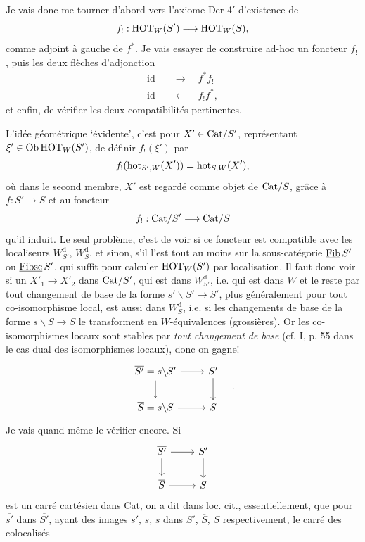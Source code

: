 Je vais donc me tourner d'abord vers l'axiome Der 4$'$ d'existence de
\[ f_! : \mathrm{HOT}_W(S') \longrightarrow \mathrm{HOT}_W(S), \]
comme adjoint à gauche de $f^*$. Je vais essayer de construire ad-hoc un foncteur $f_!$, puis les deux flèches d'adjonction
\[ \begin{aligned} \mathrm{id} &\quad\longrightarrow\quad f^*f_! \\ \mathrm{id} &\quad\longleftarrow\quad f_!f^*, \end{aligned} \]
et enfin, de vérifier les deux compatibilités pertinentes.

L'idée géométrique `évidente', c'est pour $X'\in\mathrm{Cat}/S'$, représentant $\xi'\in\mathrm{Ob}\,\mathrm{HOT}_W(S')$, de définir $f_!(\xi')$ par
\[ f_!(\mathrm{hot}_{S',W}(X')) = \mathrm{hot}_{S,W}(X'), \]
où dans le second membre, $X'$ est regardé comme objet de $\mathrm{Cat}/S$, grâce à $f:S'\longrightarrow S$ et au foncteur
\[ f_! : \mathrm{Cat}/S' \longrightarrow \mathrm{Cat}/S \]
qu'il induit. Le seul problème, c'est de voir si ce foncteur est compatible avec les
localiseurs $W_{S'}^{\mathrm{d}}$, $W_S^{\mathrm{d}}$, et sinon, s'il l'est tout au moins sur la sous-catégorie $\underline{\mathrm{Fib}}\,S'$ ou $\underline{\mathrm{Fibsc}}\,S'$, qui suffit pour calculer $\mathrm{HOT}_W(S')$ par localisation. Il faut donc voir si un $X'_1\longrightarrow X'_2$ dans $\mathrm{Cat}/S'$, qui est dans $W_{S'}^{\mathrm{d}}$, i.e. qui est dans $W$ et le reste par tout changement de base de la forme $s'\backslash S'\longrightarrow S'$, plus généralement pour tout co-isomorphisme local, est aussi dans $W_S^{\mathrm{d}}$, i.e. si les changements de base de la forme $s\backslash S\longrightarrow S$ le transforment en $W$-équivalences (grossières). Or les co-isomorphismes locaux sont stables par \textit{tout changement de base} (cf. I, p. 55 dans le cas dual des isomorphismes locaux), donc on gagne!
\[
\begin{tikzcd}
\overline{S'} = s\backslash S' \arrow[r] \arrow[d] & S' \arrow[d] \\
\overline{S} = s\backslash S \arrow[r] & S
\end{tikzcd}
\quad .
\]
Je vais quand même le vérifier encore. Si
\[
\begin{tikzcd}
\overline{S'} \arrow[r] \arrow[d] & S' \arrow[d] \\
\overline{S} \arrow[r] & S
\end{tikzcd}
\]
est un carré cartésien dans Cat, on a dit dans loc. cit., essentiellement, que pour $\overline{s'}$ dans $\overline{S'}$, ayant des images $s'$, $\overline{s}$, $s$ dans $S'$, $\overline{S}$, $S$ respectivement, le carré des colocalisés
